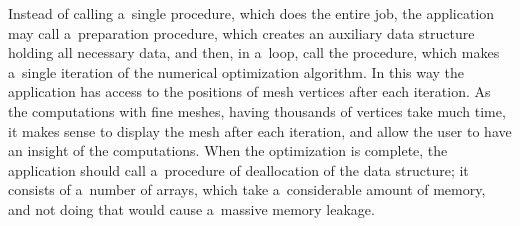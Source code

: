 Instead of calling a~single procedure, which does the entire job, the
application may call a~preparation procedure, which creates
an auxiliary data structure holding all necessary data, and then, in
a~loop, call the procedure, which makes a~single iteration of the numerical
optimization algorithm. In this way the application has access to the
positions of mesh vertices after each iteration. As the computations with
fine meshes, having thousands of vertices take much time, it makes sense
to display the mesh after each iteration, and allow the user to have an
insight of the computations. When the optimization is complete, the
application should call a~procedure of deallocation of the data structure;
it consists of a~number of arrays, which take a~considerable amount of
memory, and not doing that would cause a~massive memory leakage.

